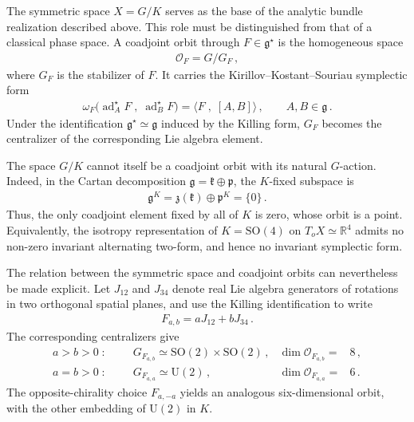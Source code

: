 \documentclass{SciPost}
\begin{document}
The symmetric space $X=G/K$ serves as the base of the analytic bundle realization described above. This role must be distinguished from that of a classical phase space. A coadjoint orbit through $F\in\mathfrak g^\star$ is the homogeneous space
\begin{align}
    \mathcal O_F=G/G_F \,,
\end{align}
where $G_F$ is the stabilizer of $F$. It carries the Kirillov--Kostant--Souriau symplectic form
\begin{align}
    \omega_F\bigl(\operatorname{ad}^\star_A F \;,\;
                 \operatorname{ad}^\star_B F\bigr)
    =\langle F \;,\; [A,B]\rangle
    \,, \qquad A,B\in\mathfrak g \,.
\end{align}
Under the identification $\mathfrak g^\star\simeq\mathfrak g$ induced by the Killing form, $G_F$ becomes the centralizer of the corresponding Lie algebra element.

The space $G/K$ cannot itself be a coadjoint orbit with its natural $G$-action. Indeed, in the Cartan decomposition $\mathfrak g=\mathfrak k\oplus\mathfrak p$, the $K$-fixed subspace is
\begin{align}
    \mathfrak g^K
    =
    \mathfrak z(\mathfrak k)\oplus\mathfrak p^K
    =\{0\} \,.
\end{align}
Thus, the only coadjoint element fixed by all of $K$ is zero, whose orbit is a point. Equivalently, the isotropy representation of $K=\mathrm{SO}(4)$ on $T_oX\simeq\mathbb R^4$ admits no non-zero invariant alternating two-form, and hence no invariant symplectic form.

The relation between the symmetric space and coadjoint orbits can nevertheless be made explicit. Let $J_{12}$ and $J_{34}$ denote real Lie algebra generators of rotations in two orthogonal spatial planes, and use the Killing identification to write
\begin{align}
    F_{a,b}=aJ_{12}+bJ_{34} \,.
\end{align}
The corresponding centralizers give
\begin{align}\label{eq:elliptic-orbits}
    a>b>0\;\colon\;\; \quad&
    G_{F_{a,b}}\simeq\mathrm{SO}(2)\times\mathrm{SO}(2) \,,
    &\dim\mathcal O_{F_{a,b}}=&8 \,,
     \\[3pt]
    a=b>0\;\colon\;\; \quad&
    G_{F_{a,a}}\simeq\mathrm U(2) \,,
    &\dim\mathcal O_{F_{a,a}}=&6 \,.
\end{align}
The opposite-chirality choice $F_{a,-a}$ yields an analogous six-dimensional orbit, with the other embedding of $\mathrm U(2)$ in $K$.
\end{document}
